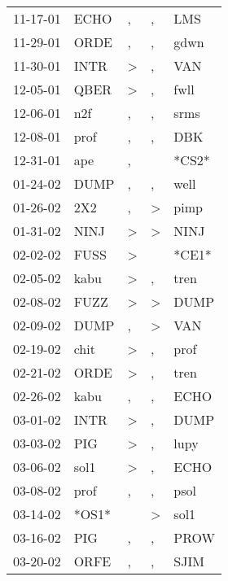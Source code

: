 \begin{supertabular}{lllll}
 11-17-01 &   ECHO &                , &                , &    LMS \\
 11-29-01 &   ORDE &                , &                , &   gdwn \\
 11-30-01 &   INTR &     \textgreater &                , &    VAN \\
 12-05-01 &   QBER &     \textgreater &                , &   fwll \\
 12-06-01 &    n2f &                , &                , &   srms \\
 12-08-01 &   prof &                , &                , &    DBK \\
 12-31-01 &    ape &                , &                  &  *CS2* \\
 01-24-02 &   DUMP &                , &                , &   well \\
 01-26-02 &    2X2 &                , &     \textgreater &   pimp \\
 01-31-02 &   NINJ &     \textgreater &     \textgreater &   NINJ \\
 02-02-02 &   FUSS &     \textgreater &                  &  *CE1* \\
 02-05-02 &   kabu &     \textgreater &                , &   tren \\
 02-08-02 &   FUZZ &     \textgreater &     \textgreater &   DUMP \\
 02-09-02 &   DUMP &                , &     \textgreater &    VAN \\
 02-19-02 &   chit &     \textgreater &                , &   prof \\
 02-21-02 &   ORDE &     \textgreater &                , &   tren \\
 02-26-02 &   kabu &                , &                , &   ECHO \\
 03-01-02 &   INTR &     \textgreater &                , &   DUMP \\
 03-03-02 &    PIG &     \textgreater &                , &   lupy \\
 03-06-02 &   sol1 &     \textgreater &                , &   ECHO \\
 03-08-02 &   prof &                , &                , &   psol \\
 03-14-02 &  *OS1* &                  &     \textgreater &   sol1 \\
 03-16-02 &    PIG &                , &                , &   PROW \\
 03-20-02 &   ORFE &                , &                , &   SJIM \\

\end{supertabular}
